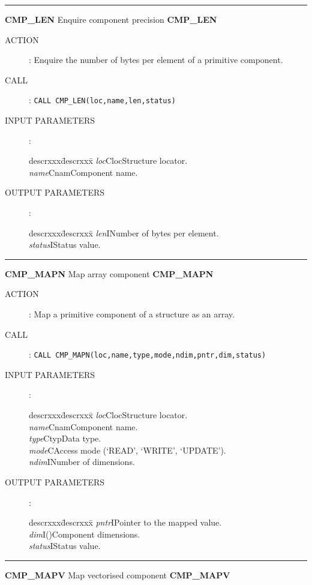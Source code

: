 \goodbreak
\rule{\textwidth}{0.3mm}
{\Large {\bf CMP\_LEN} \hfill Enquire component precision \hfill {\bf CMP\_LEN}}
\begin{description}
\item [ACTION]:
Enquire the number of bytes per element of a primitive component.
\item [CALL]:
{\tt CALL CMP\_LEN(loc,name,len,status)}
\item [INPUT PARAMETERS]:
\begin{tabbing}
descrxxx\=descrxxx\=\kill
{\em loc}\>Cloc\>Structure locator.\\
{\em name}\>Cnam\>Component name.
\end{tabbing}
\item [OUTPUT PARAMETERS]:
\begin{tabbing}
descrxxx\=descrxxx\=\kill
{\em len}\>I\>Number of bytes per element.\\
{\em status}\>I\>Status value.
\end{tabbing}
\end{description}
\goodbreak
\rule{\textwidth}{0.3mm}
{\Large {\bf CMP\_MAPN} \hfill Map array component \hfill {\bf CMP\_MAPN}}
\begin{description}
\item [ACTION]:
Map a primitive component of a structure as an array.
\item [CALL]:
{\tt CALL CMP\_MAPN(loc,name,type,mode,ndim,pntr,dim,status)}
\item [INPUT PARAMETERS]:
\begin{tabbing}
descrxxx\=descrxxx\=\kill
{\em loc}\>Cloc\>Structure locator.\\
{\em name}\>Cnam\>Component name.\\
{\em type}\>Ctyp\>Data type.\\
{\em mode}\>C\>Access mode (`READ', `WRITE', `UPDATE').\\
{\em ndim}\>I\>Number of dimensions.
\end{tabbing}
\item [OUTPUT PARAMETERS]:
\begin{tabbing}
descrxxx\=descrxxx\=\kill
{\em pntr}\>I\>Pointer to the mapped value.\\
{\em dim}\>I()\>Component dimensions.\\
{\em status}\>I\>Status value.
\end{tabbing}
\end{description}
\goodbreak
\rule{\textwidth}{0.3mm}
{\Large {\bf CMP\_MAPV} \hfill Map vectorised component \hfill {\bf CMP\_MAPV}}
